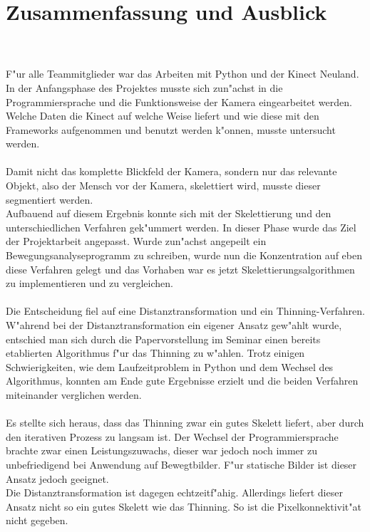 \chapter{Zusammenfassung und Ausblick}
\label{ch:ausblick}
\\\\
F"ur alle Teammitglieder war das Arbeiten mit Python und der Kinect Neuland. In der Anfangsphase des Projektes musste sich zun"achst in die Programmiersprache und die Funktionsweise der Kamera eingearbeitet werden. Welche Daten die Kinect auf welche Weise liefert und wie diese mit den Frameworks aufgenommen und benutzt werden k"onnen, musste untersucht werden.\\\\
Damit nicht das komplette Blickfeld der Kamera, sondern nur das relevante Objekt, also der Mensch vor der Kamera, skelettiert wird, musste dieser segmentiert werden.\\Aufbauend auf diesem Ergebnis konnte sich mit der Skelettierung und den unterschiedlichen Verfahren gek"ummert werden. In dieser Phase wurde das Ziel der Projektarbeit angepasst. Wurde zun"achst angepeilt ein Bewegungsanalyseprogramm zu schreiben, wurde nun die Konzentration auf eben diese Verfahren gelegt und das Vorhaben war es jetzt Skelettierungsalgorithmen zu implementieren und zu vergleichen.\\\\Die Entscheidung fiel auf eine Distanztransformation und ein Thinning-Verfahren. W"ahrend bei der Distanztransformation ein eigener Ansatz gew"ahlt wurde, entschied man sich durch die Papervorstellung im Seminar einen bereits etablierten Algorithmus f"ur das Thinning zu w"ahlen. Trotz einigen Schwierigkeiten, wie dem Laufzeitproblem in Python und dem Wechsel des Algorithmus, konnten am Ende gute Ergebnisse erzielt und die beiden Verfahren miteinander verglichen werden. \\\\
Es stellte sich heraus, dass das Thinning zwar ein gutes Skelett liefert, aber durch den iterativen Prozess zu langsam ist. Der Wechsel der Programmiersprache brachte zwar einen Leistungszuwachs, dieser war jedoch noch immer zu unbefriedigend bei Anwendung auf Bewegtbilder. F"ur statische Bilder ist dieser Ansatz jedoch geeignet. \\ Die Distanztransformation ist dagegen echtzeitf"ahig. Allerdings liefert dieser Ansatz nicht so ein gutes Skelett wie das Thinning. So ist die Pixelkonnektivit"at nicht gegeben. 
\\
